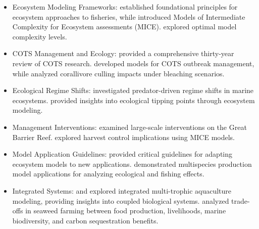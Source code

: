 \begin{itemize}
\item Ecosystem Modeling Frameworks: \cite{Plaganyi_2007} established foundational principles for ecosystem approaches to fisheries, while \cite{Plaganyi_Punt_Hillary_Morello_Thebaud_Hutton_Pillans_Thorson_Fulton_Smith_et_al_2014} introduced Models of Intermediate Complexity for Ecosystem assessments (MICE). \cite{Collie_Botsford_Hastings_Kaplan_Largier_Livingston_Plaganyi_Rose_Wells_Werner_2016} explored optimal model complexity levels.

\item COTS Management and Ecology: \cite{Pratchett_Caballes_Wilmes_Matthews_Mellin_Sweatman_Nadler_Brodie_Thompson_Hoey_et_al_2017} provided a comprehensive thirty-year review of COTS research. \cite{Morello_Plaganyi_Babcock_Sweatman_Hillary_Punt_2014} developed models for COTS outbreak management, while \cite{Rogers_Plaganyi_2022} analyzed corallivore culling impacts under bleaching scenarios.

\item Ecological Regime Shifts: \cite{Blamey_Plaganyi_Branch_2014} investigated predator-driven regime shifts in marine ecosystems. \cite{Plaganyi_Ellis_Blamey_Morello_Norman-Lopez_Robinson_Sporcic_Sweatman_2014} provided insights into ecological tipping points through ecosystem modeling.

\item Management Interventions: \cite{Condie_Anthony_Babcock_Baird_Beeden_Fletcher_Gorton_Harrison_Hobday_Plaganyi_et_al_2021} examined large-scale interventions on the Great Barrier Reef. \cite{Punt_MacCall_Essington_Francis_Hurtado-Ferro_Johnson_Kaplan_Koehn_Levin_Sydeman_2016} explored harvest control implications using MICE models.

\item Model Application Guidelines: \cite{Essington_Plaganyi_2014} provided critical guidelines for adapting ecosystem models to new applications. \cite{Gamble_Link_2009} demonstrated multispecies production model applications for analyzing ecological and fishing effects.

\item Integrated Systems: \cite{Hadley_Wild-Allen_Johnson_Macleod_2015} and \cite{Oca_Cremades_Jimenez_Pintado_Masalo_2019} explored integrated multi-trophic aquaculture modeling, providing insights into coupled biological systems. \cite{Spillias_Cottrell_2024} analyzed trade-offs in seaweed farming between food production, livelihoods, marine biodiversity, and carbon sequestration benefits.
\end{itemize}

